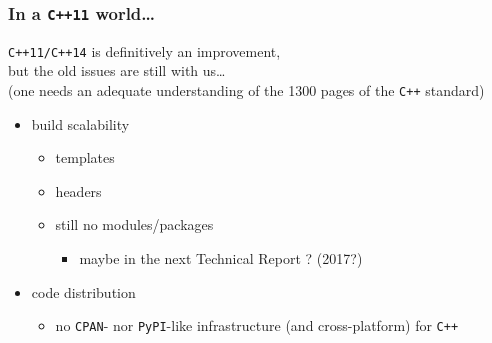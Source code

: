\documentclass[9pt]{beamer}
\newcommand{\myred}  [1] {{\color{red}#1}}
\begin{document}
\begin{frame}[fragile]
  \frametitle{In a \verb~C++11~ world\ldots{}}
  \begin{block}{}

    \begin{center}
      \texttt{C++11/C++14} is definitively an improvement, \\
      but the old issues are \myred{still with us\ldots} \\
      (one needs an adequate understanding of the 1300 pages of the \texttt{C++} standard)
    \end{center}
  \end{block}

  \quad

  \begin{itemize}
  \item \alert{build scalability}
    \begin{itemize}
    \item templates
    \item headers
    \item still no modules/packages
      \begin{itemize}
      \item maybe in the next Technical Report ? (2017?)
      \end{itemize}
    \end{itemize}
  \end{itemize}


  \begin{itemize}
  \item \alert{code distribution}
    \begin{itemize}
    \item no \texttt{CPAN}- nor \texttt{PyPI}-like infrastructure (and
      cross-platform) for \texttt{C++}
    \end{itemize}
  \end{itemize}
\end{frame}
\end{document}
